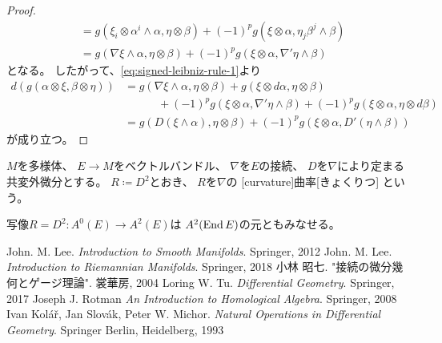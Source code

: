 \documentclass[report]{jlreq}
\begin{document}
\begin{proof}
\begin{alignat}{1}
        &= g(\xi_i \otimes \alpha^i \wedge \alpha, \eta \otimes \beta)
            + (-1)^p g(\xi \otimes \alpha, \eta_j \beta^j \wedge \beta) \\
        &= g(\nabla \xi \wedge \alpha, \eta \otimes \beta)
            + (-1)^p g(\xi \otimes \alpha, \nabla' \eta \wedge \beta)
    \end{alignat}
    となる。
    したがって、\cref{eq:signed-leibniz-rule-1}より
    \begin{alignat}{1}
        d(g(\alpha \otimes \xi, \beta \otimes \eta))
            &= g(\nabla \xi \wedge \alpha, \eta \otimes \beta)
                + g(\xi \otimes d\alpha, \eta \otimes \beta) \\
            &\qquad \quad + (-1)^p g(\xi \otimes \alpha, \nabla' \eta \wedge \beta)
                + (-1)^p g(\xi \otimes \alpha, \eta \otimes d\beta) \\
            &= g(D(\xi \wedge \alpha), \eta \otimes \beta)
                + (-1)^p g(\xi \otimes \alpha, D'(\eta \wedge \beta))
    \end{alignat}
    が成り立つ。
\end{proof}

\begin{definition}[曲率]
    $M$を多様体、
    $E \to M$をベクトルバンドル、
    $\nabla$を$E$の接続、
    $D$を$\nabla$により定まる共変外微分とする。
    $R \coloneqq D^2$とおき、
    $R$を$\nabla$の
    [curvature]{曲率}[きょくりつ]
    という。
\end{definition}

\begin{remark}
    写像$R = D^2 \colon A^0(E) \to A^2(E)$は
    $A^2(\operatorname{End} E)$の元ともみなせる。
\end{remark}



\newpage
{}
{}
\renewcommand{\bibname}{参考文献}
\markboth{\bibname}{}
\begin{thebibliography}{9}
        John. M. Lee.
        \textit{Introduction to Smooth Manifolds}.
        Springer,
        2012
        John. M. Lee.
        \textit{Introduction to Riemannian Manifolds}.
        Springer,
        2018
     小林 昭七. "接続の微分幾何とゲージ理論". 裳華房, 2004
        Loring W. Tu.
        \textit{Differential Geometry}.
        Springer,
        2017
     Joseph J. Rotman \textit{An Introduction to Homological Algebra}. Springer, 2008
        Ivan Kolář, Jan Slovák, Peter W. Michor.
        \textit{Natural Operations in Differential Geometry}.
        Springer Berlin, Heidelberg,
        1993
\end{thebibliography}
\end{document}

